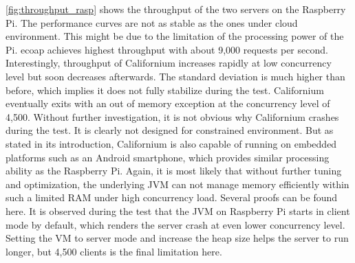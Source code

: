 \autoref{fig:throughput_rasp} shows the throughput of the two servers on the Raspberry Pi. The performance curves are not as stable as the ones under cloud environment. This might be due to the limitation of the processing power of the Pi. ecoap achieves highest throughput with about 9,000 requests per second. Interestingly, throughput of Californium increases rapidly at low concurrency level but soon decreases afterwards. The standard deviation is much higher than before, which implies it does not fully stabilize during the test. Californium eventually exits with an out of memory exception at the concurrency level of 4,500. Without further investigation, it is not obvious why Californium crashes during the test. It is clearly not designed for constrained environment. But as stated in its introduction, Californium is also capable of running on embedded platforms such as an Android smartphone, which provides similar processing ability as the Raspberry Pi. Again, it is most likely that without further tuning and optimization, the underlying JVM can not manage memory efficiently within such a limited RAM under high concurrency load. Several proofs can be found here. It is observed during the test that the JVM on Raspberry Pi starts in client mode by default, which renders the server crash at even lower concurrency level. Setting the VM to server mode and increase the heap size helps the server to run longer, but 4,500 clients is the final limitation here. 


